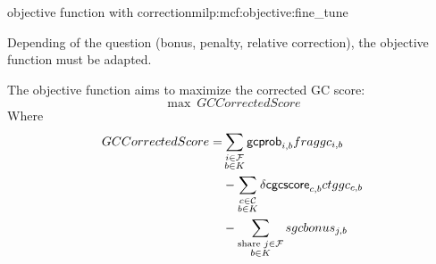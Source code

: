 \begin{definition}{\MGC{} objective function with correction}{milp:mcf:objective:fine_tune}
  \begin{fixmebox}
    Depending of the question (bonus, penalty, relative correction), the objective function must be adapted.
  \end{fixmebox}
  The objective function aims to maximize the corrected GC score:
  \begin{equation}
    \max ~ GCCorrectedScore
  \end{equation}
  Where
  \begin{align}
    \begin{split}
      GCCorrectedScore = & \sum_{\substack{
          i \in \mathcal{F}{} \\
          b \in K
      }} \mathsf{gcprob}_{i, b} fraggc_{i,b} \\
      & - \sum_{\substack{
          c \in \mathcal{C}{} \\
          b \in K
      }} \mathsf{\delta cgcscore}_{c, b}ctggc_{c,b} \\
      & - \sum_{\substack{
          \text{share } j \in \mathcal{F}{} \\
          b \in K
      }} sgcbonus_{j, b}
    \end{split}
  \end{align}
\end{definition}
